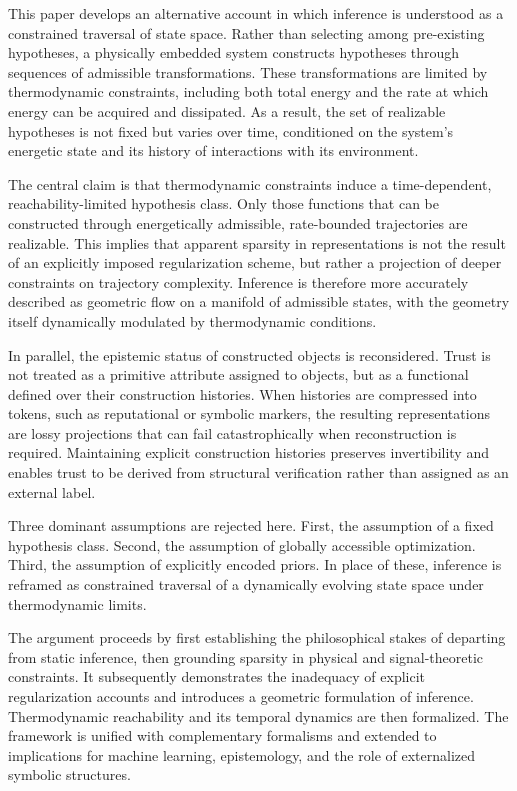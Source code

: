 \documentclass[12pt]{article}
\theoremstyle{plain}
\theoremstyle{definition}
\theoremstyle{remark}
\begin{document}
This paper develops an alternative account in which inference is understood as a constrained traversal of state space. Rather than selecting among pre-existing hypotheses, a physically embedded system constructs hypotheses through sequences of admissible transformations. These transformations are limited by thermodynamic constraints, including both total energy and the rate at which energy can be acquired and dissipated. As a result, the set of realizable hypotheses is not fixed but varies over time, conditioned on the system's energetic state and its history of interactions with its environment.

The central claim is that thermodynamic constraints induce a time-dependent, reachability-limited hypothesis class. Only those functions that can be constructed through energetically admissible, rate-bounded trajectories are realizable. This implies that apparent sparsity in representations is not the result of an explicitly imposed regularization scheme, but rather a projection of deeper constraints on trajectory complexity. Inference is therefore more accurately described as geometric flow on a manifold of admissible states, with the geometry itself dynamically modulated by thermodynamic conditions.

In parallel, the epistemic status of constructed objects is reconsidered. Trust is not treated as a primitive attribute assigned to objects, but as a functional defined over their construction histories. When histories are compressed into tokens, such as reputational or symbolic markers, the resulting representations are lossy projections that can fail catastrophically when reconstruction is required. Maintaining explicit construction histories preserves invertibility and enables trust to be derived from structural verification rather than assigned as an external label.

Three dominant assumptions are rejected here. First, the assumption of a fixed hypothesis class. Second, the assumption of globally accessible optimization. Third, the assumption of explicitly encoded priors. In place of these, inference is reframed as constrained traversal of a dynamically evolving state space under thermodynamic limits.

The argument proceeds by first establishing the philosophical stakes of departing from static inference, then grounding sparsity in physical and signal-theoretic constraints. It subsequently demonstrates the inadequacy of explicit regularization accounts and introduces a geometric formulation of inference. Thermodynamic reachability and its temporal dynamics are then formalized. The framework is unified with complementary formalisms and extended to implications for machine learning, epistemology, and the role of externalized symbolic structures.
\end{document}
